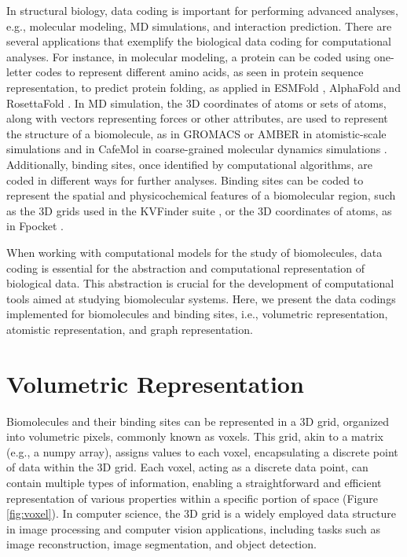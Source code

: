 \documentclass[Ingles]{phdthesis}
\def\ie{i.e.\onedot}
\def\eg{e.g.\onedot}
\begin{document}
In structural biology, data coding is important for performing advanced analyses, \eg, molecular modeling, \ac{MD} simulations, and interaction prediction. There are several applications that exemplify the biological data coding for computational analyses. For instance, in molecular modeling, a protein can be coded using one-letter codes to represent different amino acids, as seen in protein sequence representation, to predict protein folding, as applied in ESMFold \cite{lin2022}, AlphaFold \cite{jumper2021} and RosettaFold \cite{baek2021}. In \acs{MD} simulation, the \acs{3D} coordinates of atoms or sets of atoms, along with vectors representing forces or other attributes, are used to represent the structure of a biomolecule, as in GROMACS \cite{gromacs} or AMBER \cite{amber} in atomistic-scale simulations and in CafeMol in coarse-grained molecular dynamics simulations \cite{kenzaki2011}. Additionally, binding sites, once identified by computational algorithms, are coded in different ways for further analyses. Binding sites can be coded to represent the spatial and physicochemical features of a biomolecular region, such as the \acs{3D} grids used in the KVFinder suite \cite{guerra2019,guerra2020,guerra2021,guerra2023B}, or the \acs{3D} coordinates of atoms, as in Fpocket \cite{fpocket}.

When working with computational models for the study of biomolecules, data coding is essential for the abstraction and computational representation of biological data. This abstraction is crucial for the development of computational tools aimed at studying biomolecular systems. Here, we present the data codings implemented for biomolecules and binding sites, \ie, volumetric representation, atomistic representation, and graph representation.

\section{Volumetric Representation}

Biomolecules and their binding sites can be represented in a \acs{3D} grid, organized into volumetric pixels, commonly known as voxels. This grid, akin to a matrix (\eg, a numpy array), assigns values to each voxel, encapsulating a discrete point of data within the \acs{3D} grid. Each voxel, acting as a discrete data point, can contain multiple types of information, enabling a straightforward and efficient representation of various properties within a specific portion of space (Figure \ref{fig:voxel}). In computer science, the \acs{3D} grid is a widely employed data structure in image processing and computer vision applications, including tasks such as image reconstruction, image segmentation, and object detection.
\end{document}
